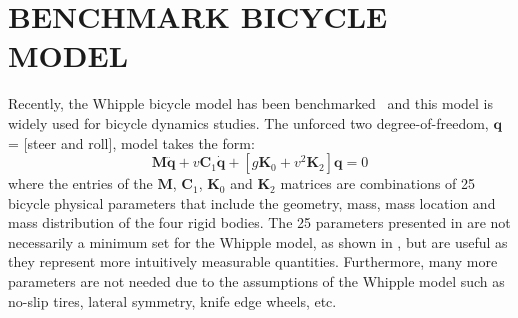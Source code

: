 \documentclass{bmd2010p}
\begin{document}
\section{BENCHMARK BICYCLE MODEL}
Recently, the Whipple bicycle model has been benchmarked~\cite{Meijaard2007}
and this model is widely used for bicycle dynamics studies. The unforced two
degree-of-freedom, $\mathbf{q}$ = [steer and roll], model takes the form:
\begin{equation}
    \mathbf{M\ddot{q}}
    +v\mathbf{C}_1\mathbf{\dot{q}}
    +\left[g\mathbf{K}_0
    +v^2\mathbf{K}_2\right]\mathbf{q}
    =0
    \label{eq:canonical}
\end{equation}
where the entries of the $\mathbf{M}$, $\mathbf{C}_1$, $\mathbf{K}_0$ and $\mathbf{K}_2$
matrices are combinations of 25 bicycle physical parameters that
include the geometry, mass, mass location and mass distribution of the four
rigid bodies. The 25 parameters presented in \cite{Meijaard2007} are not
necessarily a minimum set for the Whipple model, as shown in \cite{Sharp2008},
but are useful as they represent more intuitively measurable quantities.
Furthermore, many more parameters are not needed due to the assumptions of the
Whipple model such as no-slip tires, lateral symmetry, knife edge wheels, etc.
\end{document}
